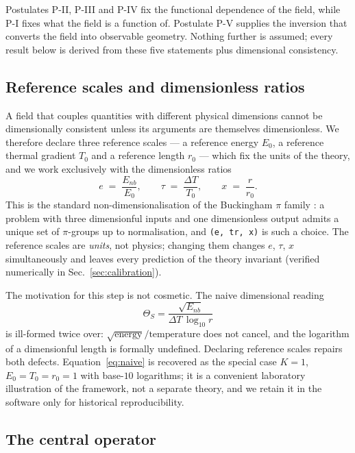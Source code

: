 \documentclass[11pt,a4paper]{article}
\newcommand{\ThetaS}{\Theta_{S}}
\newcommand{\tgrad}{\tau}
\newcommand{\code}[1]{\texttt{#1}}
\begin{document}
Postulates P-II, P-III and P-IV fix the functional dependence of the field,
while P-I fixes what the field is a function of. Postulate P-V supplies the
inversion that converts the field into observable geometry. Nothing further
is assumed; every result below is derived from these five statements plus
dimensional consistency.

\subsection{Reference scales and dimensionless ratios}
\label{sec:scales}

A field that couples quantities with different physical dimensions cannot be
dimensionally consistent unless its arguments are themselves dimensionless. We
therefore declare three reference scales --- a reference energy $E_0$, a
reference thermal gradient $T_0$ and a reference length $r_0$ --- which fix
the units of the theory, and we work exclusively with the dimensionless
ratios
\begin{equation}
  e \;=\; \frac{E_{nb}}{E_0}, \qquad
  \tgrad \;=\; \frac{\Delta T}{T_0}, \qquad
  x \;=\; \frac{r}{r_0}.
  \label{eq:ratios}
\end{equation}
This is the standard non-dimensionalisation of the Buckingham $\pi$ family
\cite{buckingham1915}: a problem with three dimensionful inputs and one
dimensionless output admits a unique set of $\pi$-groups up to normalisation,
and \code{(e, tr, x)} is such a choice. The reference scales are \emph{units},
not physics; changing them changes $e$, $\tgrad$, $x$ simultaneously and leaves
every prediction of the theory invariant (verified numerically in
Sec.~\ref{sec:calibration}).

The motivation for this step is not cosmetic. The naive dimensional reading
\begin{equation}
  \ThetaS = \frac{\sqrt{E_{nb}}}{\Delta T\,\log_{10} r}
  \label{eq:naive}
\end{equation}
is ill-formed twice over: $\sqrt{\text{energy}}/\text{temperature}$ does not
cancel, and the logarithm of a dimensionful length is formally undefined.
Declaring reference scales repairs both defects. Equation~\eqref{eq:naive} is
recovered as the special case $K=1$, $E_0=T_0=r_0=1$ with base-$10$
logarithms; it is a convenient laboratory illustration of the framework, not
a separate theory, and we retain it in the software only for historical
reproducibility.

\subsection{The central operator}
\label{sec:operator}
\end{document}
